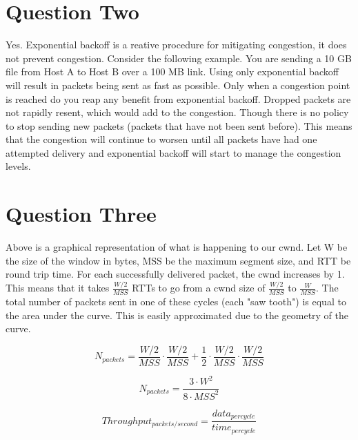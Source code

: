 \documentclass[a4paper]{article}
\begin{document}
\section{Question Two}
Yes. Exponential backoff is a reative procedure for mitigating congestion, it does not prevent congestion. Consider the following example. You are sending a 10 GB file from Host A to Host B over a 100 MB link. Using only exponential backoff will result in packets being sent as fast as possible. Only when a congestion point is reached do you reap any benefit from exponential backoff. Dropped packets are not rapidly resent, which would add to the congestion. Though there is no policy to stop sending new packets (packets that have not been sent before). This means that the congestion will continue to worsen until all packets have had one attempted delivery and exponential backoff will start to manage the congestion levels.

\section{Question Three}

\begin{center}
\end{center}

Above is a graphical representation of what is happening to our cwnd. Let W be the size of the window in bytes, MSS be the maximum segment size, and RTT be round trip time. For each successfully delivered packet, the cwnd increases by 1. This means that it takes $\frac{W/2}{\mathit{MSS}}$ RTTs to go from a cwnd size of $\frac{W/2}{\mathit{MSS}}$ to $\frac{W}{\mathit{MSS}}$. The total number of packets sent in one of these cycles (each "saw tooth") is equal to the area under the curve. This is easily approximated due to the geometry of the curve.

\[
N_{packets} = \frac{W/2}{\mathit{MSS}}\cdot\frac{W/2}{\mathit{MSS}} + \frac{1}{2}\cdot\frac{W/2}{\mathit{MSS}}\cdot\frac{W/2}{\mathit{MSS}}
\]

\[
N_{packets} = \frac{3\cdot W^{2}}{8\cdot \mathit{MSS^{2}}}
\]

\[
Throughput_{packets/second} = \frac{data_{per cycle}}{time_{per cycle}}
\]
\end{document}
